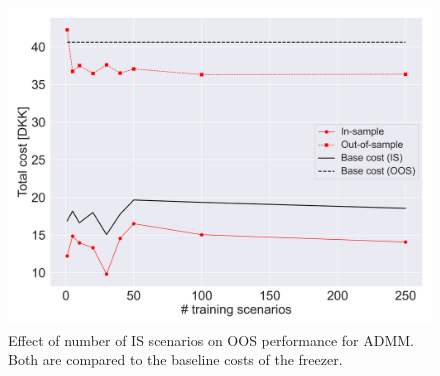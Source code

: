 \begin{figure}[!t]
    \centering
    \includegraphics[width=\columnwidth]{../figures/admm_nb_scenarios_effect.png}
    \caption{Effect of number of IS scenarios on OOS performance for ADMM. Both are compared to the baseline costs of the freezer.}
    \label{fig:admm_nb_scenarios_effect}
\end{figure}


